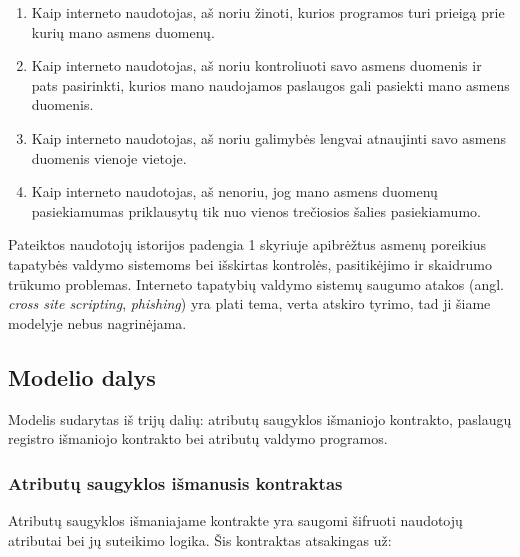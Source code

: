 \begin{enumerate}
    \item Kaip interneto naudotojas, aš noriu žinoti, kurios programos turi prieigą prie kurių mano asmens duomenų.
    \item Kaip interneto naudotojas, aš noriu kontroliuoti savo asmens duomenis ir pats pasirinkti, kurios mano naudojamos paslaugos gali pasiekti mano
    asmens duomenis.
    \item Kaip interneto naudotojas, aš noriu galimybės lengvai atnaujinti savo asmens duomenis vienoje vietoje.
    \item Kaip interneto naudotojas, aš nenoriu, jog mano asmens duomenų pasiekiamumas priklausytų tik nuo vienos trečiosios šalies pasiekiamumo.
\end{enumerate}

Pateiktos naudotojų istorijos padengia 1 skyriuje apibrėžtus asmenų poreikius tapatybės valdymo
sistemoms bei išskirtas kontrolės, pasitikėjimo ir skaidrumo trūkumo problemas. Interneto tapatybių valdymo sistemų saugumo atakos (angl.
\textit{cross site scripting}, \textit{phishing}) yra plati tema, verta atskiro tyrimo, tad ji šiame modelyje nebus nagrinėjama.

\subsection{Modelio dalys}

Modelis sudarytas iš trijų dalių: atributų saugyklos išmaniojo kontrakto, paslaugų registro išmaniojo kontrakto
bei atributų valdymo programos.

\subsubsection{Atributų saugyklos išmanusis kontraktas} \label{BCIDM:blockchainFunctions}

Atributų saugyklos išmaniajame kontrakte yra saugomi šifruoti naudotojų atributai bei jų suteikimo logika. Šis kontraktas atsakingas už:

